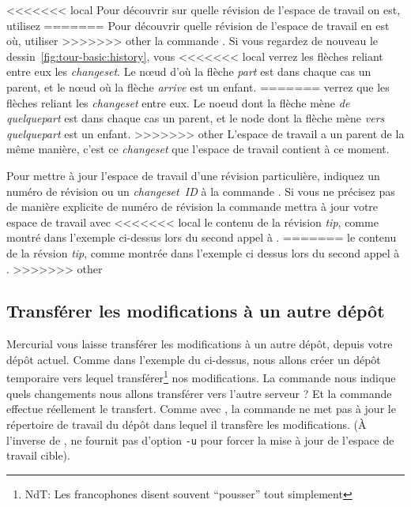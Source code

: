 <<<<<<< local
Pour découvrir sur quelle révision de l'espace de travail on est, utilisez
=======
Pour découvrir quelle révision de l'espace de travail en est où, utiliser
>>>>>>> other
la commande . 
Si vous regardez de nouveau le dessin~\ref{fig:tour-basic:history}, vous
<<<<<<< local
verrez les flèches reliant entre eux les \textit{changeset}. Le nœud 
d'où la flèche \emph{part} est dans chaque cas un parent, 
et le nœud où la flèche \emph{arrive} est un enfant. 
=======
verrez que les flèches reliant les \textit{changeset} entre eux. Le noeud 
dont la flèche mène \emph{de quelquepart} est dans chaque cas un parent, 
et le node dont la flèche mène \emph{vers quelquepart} est un enfant. %
>>>>>>> other
L'espace de travail a un parent de la même manière, c'est ce \textit{changeset} 
que l'espace de travail contient à ce moment.

Pour mettre à jour l'espace de travail d'une révision particulière, 
indiquez un numéro de révision ou un \textit{changeset~ID} à la commande 
.
Si vous ne précisez pas de manière explicite de numéro de révision
la commande  mettra à jour votre espace de travail avec
<<<<<<< local
le contenu de la révision \textit{tip}, comme montré dans l'exemple 
ci-dessus lors du second appel à .
=======
le contenu de la révsion \textit{tip}, comme montrée dans l'exemple 
ci dessus lors du second appel à .
>>>>>>> other

\subsection{Transférer les modifications à un autre dépôt}

Mercurial vous laisse transférer les modifications à un autre
dépôt, depuis votre dépôt actuel. Comme dans l'exemple du 
 ci-dessus, nous allons créer un dépôt temporaire
vers lequel transférer\footnote{NdT: Les francophones disent souvent 
``pousser'' tout simplement} nos modifications.
La commande  nous indique quels changements nous
allons transférer vers l'autre serveur ?
Et la commande  effectue réellement le transfert.
Comme avec , la commande  ne met pas à jour
le répertoire de travail du dépôt dans lequel il transfère les 
modifications. (À l'inverse de ,  ne fournit
pas d'option \texttt{-u} pour forcer la mise à jour de l'espace
de travail cible).

